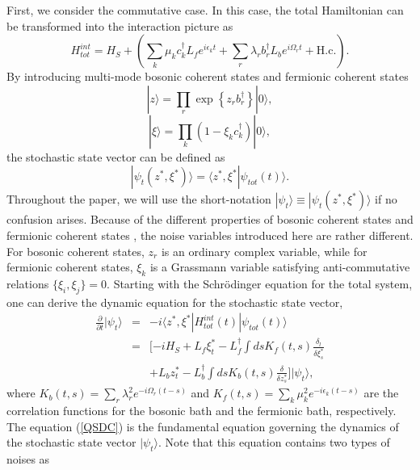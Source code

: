 \documentclass[preprint]{elsarticle}
\begin{document}
First, we consider the commutative case.   In this case, the total Hamiltonian can be transformed
into the interaction picture as
\begin{equation}
H_{tot}^{int}=H_{S}+(\sum_{k}\mu_{k}c_{k}^{\dagger}L_{f}e^{i\epsilon_{k}t}+\sum_{r}\lambda_{r}b_{r}^{\dagger}L_{b}e^{i\Omega_{r}t}+\mathrm{H.c.}).
\end{equation}
By introducing multi-mode bosonic coherent states and fermionic coherent
states
\begin{equation}
|z\rangle=\prod_{r}\exp\left\{ z_{r}b_{r}^{\dagger}\right\} |0\rangle,
\end{equation}
\begin{equation}
|\xi\rangle=\prod_{k}\left(1-\xi_{k}c_{k}^{\dagger}\right)|0\rangle,
\end{equation}
the stochastic state vector can be defined as
\begin{equation}
|\psi_{t}(z^{*},\xi^{*})\rangle=\langle z^{*},\xi^{*}|\psi_{tot}(t)\rangle.
\end{equation}
Throughout the paper, we will use the short-notation $|\psi_{t}\rangle\equiv|\psi_{t}(z^{*},\xi^{*})\rangle$
if no confusion arises. Because of the different properties of bosonic
coherent states and fermionic coherent states \cite{ZhangRMP}, the
noise variables introduced here are rather different. For bosonic coherent
states, $z_{r}$ is an ordinary complex variable, while for fermionic coherent
states, $\xi_{k}$ is a Grassmann variable satisfying anti-commutative
relations $\{\xi_{i},\xi_{j}\}=0$. Starting with the Schr\"{o}dinger
equation for the total system,  one can derive the dynamic equation for the stochastic
state vector,
\begin{eqnarray}
\frac{\partial}{\partial t}|\psi_{t}\rangle & = & -i\langle z^{*},\xi^{*}|H_{tot}^{int}(t)|\psi_{tot}(t)\rangle\nonumber \\
 & = & [-iH_{S}+L_{f}\xi_{t}^{\ast}-L_{f}^{\dagger}\int dsK_{f}(t,s)\frac{\delta_{l}}{\delta\xi_{s}^{\ast}}\nonumber \\
 &  & +L_{b}z_{t}^{\ast}-L_{b}^{\dagger}\int dsK_{b}(t,s)\frac{\delta}{\delta z_{s}^{\ast}}]|\psi_{t}\rangle,\label{QSDC}
\end{eqnarray}
where $K_{b}(t,s)=\sum_{r}\lambda_{r}^{2}e^{-i\Omega_{r}(t-s)}$ and
$K_{f}(t,s)=\sum_{k}\mu_{k}^{2}e^{-i\epsilon_{k}(t-s)}$ are the correlation
functions for the bosonic bath and  the fermionic bath,  respectively. The equation
(\ref{QSDC}) is the fundamental equation governing the dynamics
of the stochastic state vector $|\psi_{t}\rangle$. Note that this equation contains two types of noises as
\end{document}
